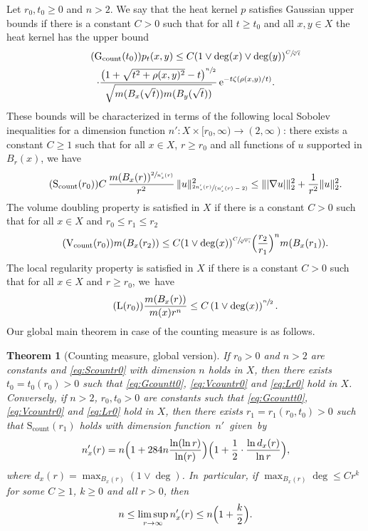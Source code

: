 \documentclass[JEP,XML,SOM,Unicode,published]{cedram}
\newcommand{\spfrac}[2]{\sfrac{#1}{(#2)}}
\newcommand{\rcount}{\mathrm{count}}
\newcommand{\rG}{\mathrm{G}}
\newcommand{\rS}{\mathrm{S}}
\newcommand{\rV}{\mathrm{V}}
\theoremstyle{plain}
\newtheorem{theorem}{Theorem}[section]
\theoremstyle{definition}
\newcommand{\euler}{\mathrm{e}}
\begin{document}
Let $r_0,t_0\geq 0$ and $n>2$.
We say that the heat kernel $p$ satisfies Gaussian upper bounds if there is a constant $C>0$ such that for all $t\geq t_0$ and all $x,y\in X$ the heat kernel has the upper bound
\begin{multline}\tag{$\rG_{\rcount}(t_0)$}\label{eq:Gcountt0}
p_{t}(x,y)
\leq C(1\vee \deg(x)\vee \deg(y))
^{\sfrac{C}{\!\sqrt[ n]{t}}}\\
\cdot
\frac{\bigl(1+\sqrt{t^2+\rho(x,y)^2}-t\bigr)^{\sfrac{n}{2}}}
{\sqrt{m(B_{x}(\sqrt {t}))m(B_{y}(\sqrt {t}))}}\,
\euler^{-t\zeta(\rho(x,y)/t)}.
\end{multline}
These bounds will be characterized in terms of the following local Sobolev inequalities for a dimension function $n'\colon X\times [r_0,\infty)\to(2,\infty)$: there exists a {constant} $C\geq 1$ such that for all $x\in X$, $r\geq r_0$ and all functions of $u$ supported in $B_r(x)$, we have
\begin{equation}\tag{$\rS_{\rcount}(r_0)$}\label{eq:Scountr0}
C\,\frac{m(B_x(r))^{\sfrac{2}{n'_x(r)}}}{r^2}\,
\Vert u\Vert_{\spfrac{2n'_x(r)}{n'_x(r)-2}}^2
\leq \Vert \vert\nabla u\vert\Vert_2^2+\frac{1}{r^2}\Vert u\Vert_2^2.
\end{equation}
The {volume doubling} property is satisfied in $X$ if there is a constant $C>0$ such that for all $x\in X$ and $r_0\leq r_1\leq r_2$
\begin{equation}\tag{$\rV_{\rcount}(r_0)$}\label{eq:Vcountr0}
m(B_x(r_2))\leq C(1\vee\deg(x))
^{\sfrac{C}{\!\sqrt[ n]{r_1}}}\Bigl(\frac{r_2}{r_1}\Bigr)^{n} m(B_x(r_1)).
\end{equation}
The local regularity property is satisfied in $ X $ if there is a constant $C>0$ such that for all $x\in X$ and $r\geq r_0$, we~have
\begin{equation}\tag{L$(r_0)$}\label{eq:Lr0}
\frac{m(B_x(r))}{m(x)r^n}
\leq C\left(1\vee\deg(x)\right)^{\sfrac{n}2}.
\end{equation}
Our global main theorem in case of the counting measure is as follows.

\begin{theorem}[Counting measure, global version]\label{thm:countingglobal}
If $r_0>0$ and $n>2$ are constants and \eqref{eq:Scountr0} with dimension $n$ holds in $X$, then there exists \hbox{$t_0=t_0(r_0)>0$} such that \eqref{eq:Gcountt0}, \eqref{eq:Vcountr0} and \eqref{eq:Lr0} hold in $X$. Conversely, if $n{>2}$, $r_0,t_0>0$ are constants such that \eqref{eq:Gcountt0}, \eqref{eq:Vcountr0} and \eqref{eq:Lr0} hold in $X$, then there exists $r_1=r_1(r_0,t_0)>0$ such that $\rS_\rcount(r_1)$ holds with dimension function~$n'$~given~by
\[
n_x'(r)
=
n \Bigl(1+284n\frac{\ln(\ln r) }{\ln(r) } \Bigr)\Bigl(1+\frac{1}{2}\cdot\frac{\ln d_{x}(r)}{\ln r}\Bigr),
\]
where $d_x(r)=\max_{B_x(r)}(1\vee\deg)$. In~particular, if $\max_{B_x(r)}\deg\leq C r^k$ for some $C\geq 1$, $k\geq 0$ and all $r>0$, then
\[
n\leq \limsup_{r\to\infty}n'_x(r)\leq n\Bigl(1+\frac{k}{2}\Bigr).
\]
\end{theorem}
\end{document}
